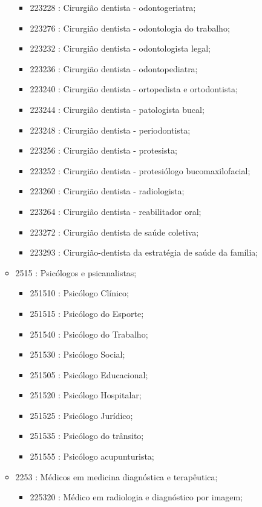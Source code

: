 \begin{itemize}
\begin{itemize}
\begin{itemize}
      \item 223228 : Cirurgião dentista - odontogeriatra;
      \item 223276 : Cirurgião dentista - odontologia do trabalho;
      \item 223232 : Cirurgião dentista - odontologista legal;
      \item 223236 : Cirurgião dentista - odontopediatra;
      \item 223240 : Cirurgião dentista - ortopedista e ortodontista;
      \item 223244 : Cirurgião dentista - patologista bucal;
      \item 223248 : Cirurgião dentista - periodontista;
      \item 223256 : Cirurgião dentista - protesista;
      \item 223252 : Cirurgião dentista - protesiólogo bucomaxilofacial;
      \item 223260 : Cirurgião dentista - radiologista;
      \item 223264 : Cirurgião dentista - reabilitador oral;
      \item 223272 : Cirurgião dentista de saúde coletiva;
      \item 223293 : Cirurgião-dentista da estratégia de saúde da família;
    \end{itemize}
    \item 2515 : Psicólogos e psicanalistas;
    \begin{itemize}
      \item 251510 : Psicólogo Clínico;
      \item 251515 : Psicólogo do Esporte;
      \item 251540 : Psicólogo do Trabalho;
      \item 251530 : Psicólogo Social;
      \item 251505 : Psicólogo Educacional;
      \item 251520 : Psicólogo Hospitalar;
      \item 251525 : Psicólogo Jurídico;
      \item 251535 : Psicólogo do trânsito;
      \item 251555 : Psicólogo acupunturista;
    \end{itemize}
    \item 2253 : Médicos em medicina diagnóstica e terapêutica;
    \begin{itemize}
      \item 225320 : Médico em radiologia e diagnóstico por imagem;

\end{itemize}
\end{itemize}
\end{itemize}

